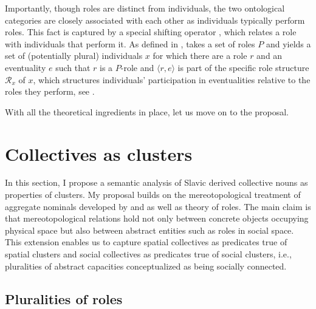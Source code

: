 \documentclass[output=paper]{langscibook}
\begin{document}
Importantly, though roles are distinct from individuals, the two ontological categories are closely associated with each other as individuals typically perform roles. This fact is captured by a special shifting operator , which relates a role with individuals that perform it. As defined in ,  takes a set of roles $P$ and yields a set of (potentially plural) individuals $x$ for which there are a role $r$ and an eventuality $e$ such that $r$ is a $P$-role and $\langle r,e\rangle$ is part of the specific role structure $\mathscr{R}_x$ of $x$, which structures individuals' participation in eventualities relative to the roles they perform, see  \citep[451]{zobel2017sensitivity}. 

\label{wan:form:play}
\z

\label{wan:form:role-structure}
\z

\noindent With all the theoretical ingredients in place, let us move on to the proposal.

\section{Collectives as clusters}\label{wan:sec:collectives-as-clusters}

In this section, I propose a semantic analysis of Slavic derived collective nouns as properties of clusters. My proposal builds on the mereotopological treatment of aggregate nominals developed by \citet{grimm2012number} and \citet{grimm_docekal-toappear-counting} as well as  theory of roles. The main claim is that mereotopological relations hold not only between concrete objects occupying physical space but also between abstract entities such as roles in social space. This extension enables us to capture spatial collectives as predicates true of spatial clusters and social collectives as predicates true of social clusters, i.e., pluralities of abstract capacities conceptualized as being socially connected.

\subsection{Pluralities of roles}\label{wan:sect:pluralities-of-roles}
\end{document}
